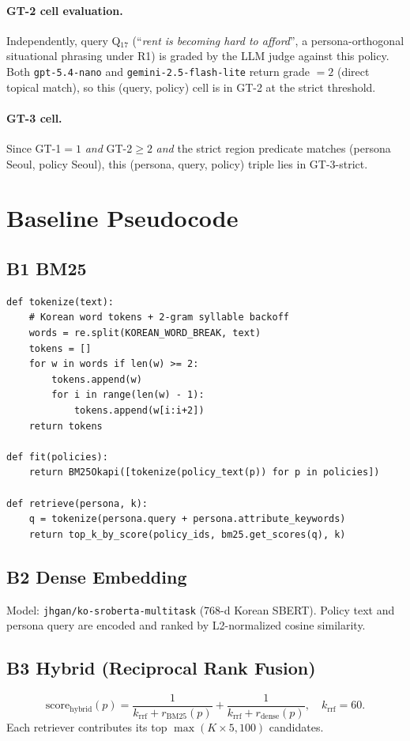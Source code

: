\documentclass{article}
\begin{document}
\paragraph{GT-2 cell evaluation.}
Independently, query Q$_{17}$ (``\textit{rent is becoming hard to
afford}'', a persona-orthogonal situational phrasing under R1) is
graded by the LLM judge against this policy. Both
\texttt{gpt-5.4-nano} and \texttt{gemini-2.5-flash-lite} return
grade $=2$ (direct topical match), so this (query, policy) cell is
in GT-2 at the strict threshold.

\paragraph{GT-3 cell.}
Since GT-1$=1$ \emph{and} GT-2$\geq{}2$ \emph{and} the strict region
predicate matches (persona Seoul, policy Seoul), this (persona, query,
policy) triple lies in GT-3-strict.

\section{Baseline Pseudocode}
\label{app:baselines}

\subsection{B1 BM25}
\begin{verbatim}
def tokenize(text):
    # Korean word tokens + 2-gram syllable backoff
    words = re.split(KOREAN_WORD_BREAK, text)
    tokens = []
    for w in words if len(w) >= 2:
        tokens.append(w)
        for i in range(len(w) - 1):
            tokens.append(w[i:i+2])
    return tokens

def fit(policies):
    return BM25Okapi([tokenize(policy_text(p)) for p in policies])

def retrieve(persona, k):
    q = tokenize(persona.query + persona.attribute_keywords)
    return top_k_by_score(policy_ids, bm25.get_scores(q), k)
\end{verbatim}

\subsection{B2 Dense Embedding}
Model: \texttt{jhgan/ko-sroberta-multitask} (768-d Korean SBERT).
Policy text and persona query are encoded and ranked by L2-normalized
cosine similarity.

\subsection{B3 Hybrid (Reciprocal Rank Fusion)}
\[
\mathrm{score}_{\text{hybrid}}(p) =
\frac{1}{k_{\text{rrf}} + r_{\text{BM25}}(p)}
+ \frac{1}{k_{\text{rrf}} + r_{\text{dense}}(p)},
\quad k_{\text{rrf}}{=}60.
\]
Each retriever contributes its top $\max(K{\times}5, 100)$
candidates.
\end{document}
